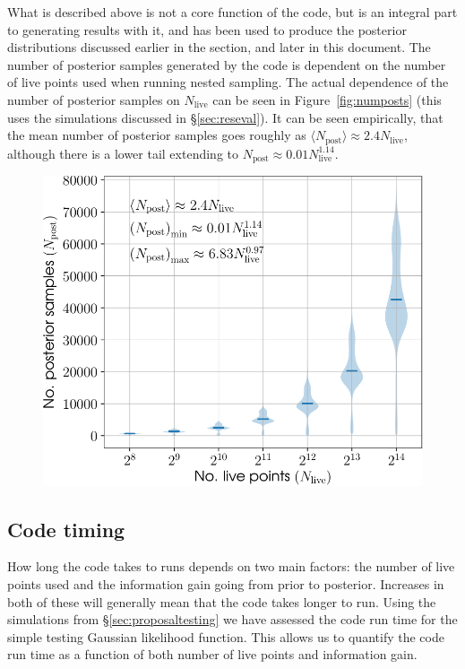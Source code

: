 What is described above is not a core function of the \lppen code, but is an integral part to generating results with it, and has been used to
produce the posterior distributions discussed earlier in the section, and later in this document. The number of posterior samples generated by the code is
dependent on the number of live points used when running nested sampling. The actual dependence of the number of posterior samples on $N_{\text{live}}$ can be seen in
Figure~\ref{fig:numposts} (this uses the simulations discussed in \S\ref{sec:reseval}). It can be seen empirically, that the mean number of posterior
samples goes roughly as $\langle N_{\text{post}} \rangle \approx 2.4N_{\text{live}}$, although there is a lower tail extending to $N_{\text{post}} \approx
0.01N_{\text{live}}^{1.14}$.

\begin{figure}[!phtb]
\begin{center}
\includegraphics[width=1\columnwidth]{./figures/codeeval/stats/numposts/numposts}
\caption{ \protect}
\end{center}
\end{figure}

\subsection{Code timing}\label{sec:timing}

How long the code takes to runs depends on two main factors: the number of live points used and the information gain going from prior to posterior. Increases
in both of these will generally mean that the code takes longer to run. Using the simulations from \S\ref{sec:proposaltesting} we have assessed the code
run time for the simple testing Gaussian likelihood function. This allows us to quantify the code run time as a function of both number of live points and information
gain.

